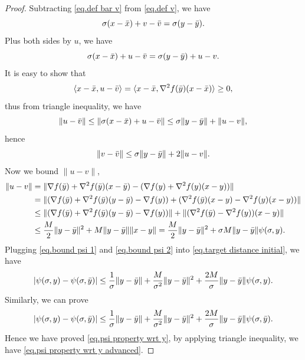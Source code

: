 \documentclass{article}
\begin{document}
\begin{proof}
    Subtracting \eqref{eq.def bar v} from \eqref{eq.def v}, we have
    \begin{equation*}
        \sigma(x-\Bar{x})+v -\Bar{v} = \sigma(y-\Bar{y}).
    \end{equation*}
    Plus both sides by $u$, we have
    \begin{equation*}
        \sigma(x-\Bar{x})+u-\Bar{v} = \sigma(y-\Bar{y})+u-v.
    \end{equation*}
    It is easy to show that
    \begin{equation*}
        \langle x-\Bar{x},u-\Bar{v}\rangle = \langle x-\Bar{x},\nabla ^2 f(\Bar{y})(x-\Bar{x})\rangle\geq 0,
    \end{equation*}
    thus from triangle inequality, we have
    \begin{equation*}
        \|u-\Bar{v}\| \leq \|\sigma(x-\Bar{x})+u-\Bar{v}\| \leq \sigma \|y-\Bar{y}\|+\|u-v\|,
    \end{equation*}
    hence
    \begin{equation}\label{eq.bound psi 1}
        \|v-\Bar{v}\| \leq \sigma\|y-\Bar{y}\| +2\|u-v\|.
    \end{equation}
    Now we bound $\|u-v\|$,
    \begin{equation}\label{eq.bound psi 2}
        \begin{aligned}
            \|u-v\| & = \|\nabla f(\Bar{y})+\nabla ^2 f(\Bar{y})(x-\Bar{y})-(\nabla f(y) + \nabla ^2 f(y)(x-y))\|                              \\
                    & = \|(\nabla f(\Bar{y})+\nabla^2 f(\Bar{y})(y-\Bar{y})-\nabla f(y))+(\nabla^2 f(\Bar{y})(x-y)-\nabla^2 f(y)(x-y))\|       \\
                    & \leq \|(\nabla f(\Bar{y})+\nabla^2 f(\Bar{y})(y-\Bar{y})-\nabla f(y))\| +\|(\nabla^2 f(\Bar{y})-\nabla^2 f(y))(x-y)\|    \\
                    & \leq \frac{M}{2}\|y-\Bar{y}\|^2+M\|y-\Bar{y}\|\|x-y\|  =\frac{M}{2}\|y-\Bar{y}\|^2+\sigma M \|y-\Bar{y}\|\psi(\sigma,y).
        \end{aligned}
    \end{equation}
    Plugging \eqref{eq.bound psi 1} and \eqref{eq.bound psi 2} into \eqref{eq.target distance initial}, we have
    \begin{equation*}
        \left \vert \psi(\sigma,y)-\psi(\sigma,\Bar{y}) \right\vert \leq \frac{1}{\sigma}\|y-\Bar{y}\| +\frac{M}{\sigma^2}\|y-\Bar{y}\|^2 +\frac{2M}{\sigma}\|y-\Bar{y}\|\psi(\sigma,y).
    \end{equation*}
    Similarly, we can prove
    \begin{equation*}
        \left \vert \psi(\sigma,y)-\psi(\sigma,\Bar{y}) \right\vert \leq \frac{1}{\sigma}\|y-\Bar{y}\| +\frac{M}{\sigma^2}\|y-\Bar{y}\|^2 +\frac{2M}{\sigma}\|y-\Bar{y}\|\psi(\sigma,\Bar{y}).
    \end{equation*}
    Hence we have proved \eqref{eq.psi property wrt y}, by applying triangle inequality, we have \eqref{eq.psi property wrt y advanced}.
\end{proof}
\end{document}
